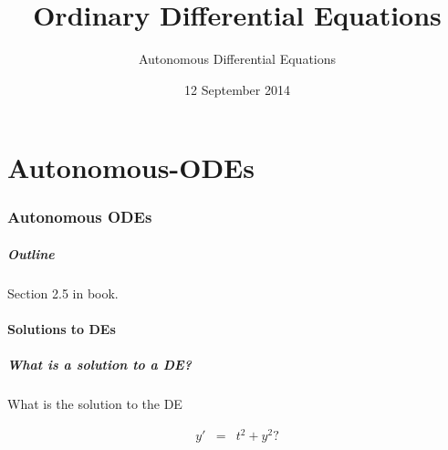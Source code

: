 \part{Autonomous-ODEs}
\section{Autonomous ODEs}

\title{Ordinary Differential Equations}
\subtitle{Autonomous Differential Equations}
\date{12 September 2014}

\begin{frame}
  \titlepage
\end{frame}

\begin{frame}
  \frametitle{Outline}
  \tableofcontents[currentsection]

  Section 2.5 in book.
\end{frame}


\subsection{Solutions to DEs}


\begin{frame}
  \frametitle{What is a solution to a DE?}

  What is the solution to the DE

  \begin{eqnarray*}
    y' & = & t^2 + y^2?
  \end{eqnarray*}



\end{frame}


